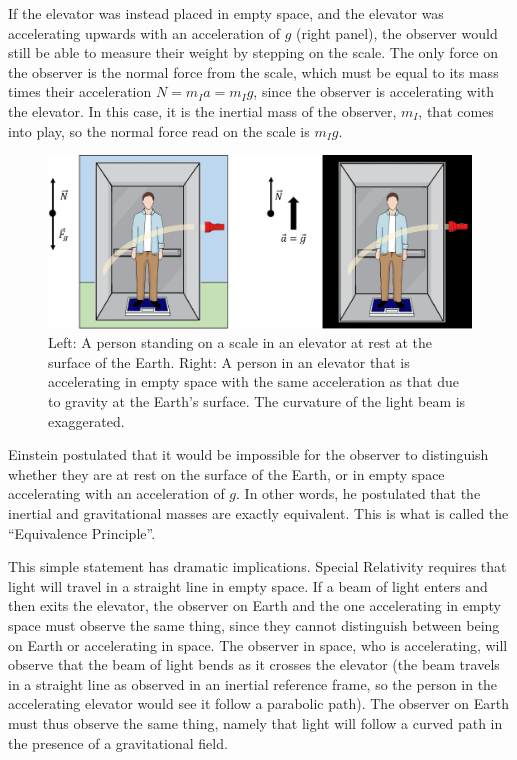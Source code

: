 If the elevator was instead placed in empty space, and the elevator was accelerating upwards with an acceleration of $g$ (right panel), the observer would still be able to measure their weight by stepping on the scale. The only force on the observer is the normal force from the scale, which must be equal to its mass times their acceleration $N=m_Ia=m_Ig$, since the observer is accelerating with the elevator. In this case, it is the inertial mass of the observer, $m_I$, that comes into play, so the normal force read on the scale is $m_Ig$.

\begin{figure}[!htbp]
\centering
\includegraphics[width=0.8\linewidth]{files/elevator-cb051ec5733dec3aa2b4fdbfb11190a9.png}
\caption[]{Left: A person standing on a scale in an elevator at rest at the surface of the Earth. Right: A person in an elevator that is accelerating in empty space with the same acceleration as that due to gravity at the Earth's surface. The curvature of the light beam is exaggerated.}
\label{fig:gravity:elevator}
\end{figure}

Einstein postulated that it would be impossible for the observer to distinguish whether they are at rest on the surface of the Earth, or in empty space accelerating with an acceleration of $g$. In other words, he postulated that the inertial and gravitational masses are exactly equivalent. This is what is called the ``Equivalence Principle''.

This simple statement has dramatic implications. Special Relativity requires that light will travel in a straight line in empty space. If a beam of light enters and then exits the elevator, the observer on Earth and the one accelerating in empty space must observe the same thing, since they cannot distinguish between being on Earth or accelerating in space. The observer in space, who is accelerating, will observe that the beam of light bends as it crosses the elevator (the beam travels in a straight line as observed in an inertial reference frame, so the person in the accelerating elevator would see it follow a parabolic path). The observer on Earth must thus observe the same thing, namely that light will follow a curved path in the presence of a gravitational field.

